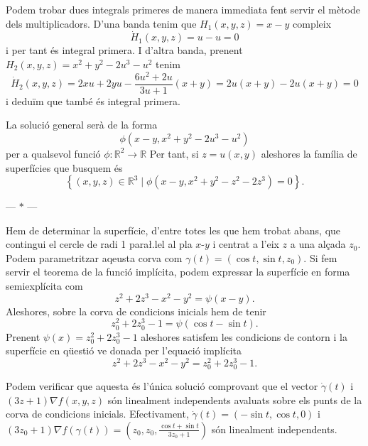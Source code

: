 \documentclass[12pt]{article}
\numberwithin{table}{section}
\numberwithin{equation}{section}
\numberwithin{figure}{section}
\newcommand{\R}{\mathbb{R}}
\newcommand{\set}[2]{\left\{ #1 \mid #2 \right\}}
\newcommand{\parbreak}{
	\begin{center}
		--- $\ast$ ---
	\end{center} 
}
\begin{document}
Podem trobar dues integrals primeres de manera immediata fent servir el mètode dels multiplicadors. D'una banda tenim que \( H_1(x,y,z) = x - y \) compleix
\begin{equation*}
	\dot{H}_1(x,y,z) = u - u = 0
\end{equation*}
i per tant és integral primera. I d'altra banda, prenent \( H_2(x,y,z) = x^2 + y^2 - 2u^3 - u^2 \) tenim
\begin{equation*}
	\dot{H}_2(x,y,z) = 2xu + 2yu - \frac{6u^2 + 2u}{3u + 1} (x+y) = 2u(x+y) - 2u(x+y) = 0
\end{equation*}
i deduïm que també és integral primera. 

La solució general serà de la forma
\begin{equation*}
	\phi(x - y, x^2 + y^2 -2u^3 - u^2)
\end{equation*}
per a qualsevol funció \( \phi \colon \R^2 \to \R \)
Per tant, si \( z = u(x,y) \) aleshores la família de superfícies que busquem és
\begin{equation*}
	\set{(x,y,z) \in \R^3}{\phi(x - y, x^2 + y^2 - z^2 -2z^3) = 0}.
\end{equation*}

\parbreak

Hem de determinar la superfície, d'entre totes les que hem trobat abans, que contingui el cercle de radi 1 para\l.lel al pla \( x \)-\( y \) i centrat a l'eix \( z \) a una alçada \( z_0 \). Podem parametritzar aqeusta corva com \( \gamma(t) = (\cos{t}, \sin{t}, z_0) \). Si fem servir el teorema de la funció implícita, podem expressar la superfície en forma semiexplícita com
\begin{equation*}
	z^2 + 2z^3 - x^2 - y^2 = \psi(x - y).
\end{equation*}
Aleshores, sobre la corva de condicions inicials hem de tenir
\begin{equation*}
	z_0^2 + 2z_0^3 - 1 = \psi(\cos{t}- \sin{t}).
\end{equation*}
Prenent \( \psi(x) = z_0^2 + 2z_0^3 - 1 \) aleshores satisfem les condicions de contorn i la superfície en qüestió ve donada per l'equació implícita
\begin{equation*}
	z^2 + 2z^3 - x^2 -y^2 = z_0^2 + 2z_0^3 -1.
\end{equation*}

Podem verificar que aquesta és l'única solució comprovant que el vector \( \dot{\gamma}(t) \) i \( (3z+1) \nabla f(x,y,z) \) són linealment independents avaluats sobre els punts de la corva de condicions inicials. Efectivament, \( \dot{\gamma}(t) = (-\sin{t}, \cos{t}, 0) \) i \( (3z_0 + 1) \nabla f(\gamma(t)) = \left(z_0, z_0, \frac{\cos{t} + \sin{t}}{3z_0 + 1}\right)  \) són linealment independents. 
\end{document}
